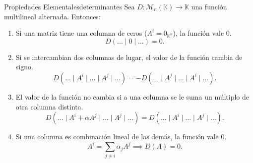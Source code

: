 \documentclass[11pt, a4paper]{article}
\begin{document}
\begin{proposicion}{Propiedades Elementales}{determinantes}
Sea $D: \mathcal{M}_{n}(\mathbb{K}) \to \mathbb{K}$ una función multilineal alternada. Entonces:

\begin{enumerate}
    \item
    Si una matriz tiene una columna de ceros ($A^i = 0_{\mathbb{K}^n}$), la función vale 0.
    \[ D(\dots \mid 0 \mid \dots) = 0. \]

    \item
    Si se intercambian dos columnas de lugar, el valor de la función cambia de signo.
    \[ D(\dots \mid A^i \mid \dots \mid A^j \mid \dots) = - D(\dots \mid A^j \mid \dots \mid A^i \mid \dots). \]

    \item
    El valor de la función no cambia si a una columna se le suma un múltiplo de otra columna distinta.
    \[ D(\dots \mid A^i + \alpha A^j \mid \dots \mid A^j \mid \dots) = D(\dots \mid A^i \mid \dots \mid A^j \mid \dots). \]

    \item
    Si una columna es combinación lineal de las demás, la función vale 0.
    \[ A^i = \sum_{j \neq i} \alpha_j A^j \implies D(A) = 0. \]
\end{enumerate}
\end{proposicion}
\end{document}
